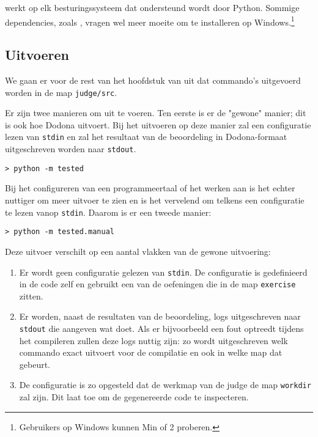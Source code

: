 \tested{} werkt op elk besturingssysteem dat ondersteund wordt door Python.
Sommige dependencies, zoals , vragen wel meer moeite om te installeren op Windows.\footnote{Gebruikers op Windows kunnen Min of 2 proberen.}

\subsection{Uitvoeren}\label{subsec:uitvoeren}

We gaan er voor de rest van het hoofdstuk van uit dat commando's uitgevoerd worden in de map \texttt{judge/src}.

Er zijn twee manieren om \tested{} uit te voeren.
Ten eerste is er de "gewone" manier;
dit is ook hoe Dodona \tested{} uitvoert.
Bij het uitvoeren op deze manier zal \tested{} een configuratie lezen van \texttt{stdin} en zal het resultaat van de beoordeling in Dodona-formaat uitgeschreven worden naar \texttt{stdout}.

\begin{verbatim}
> python -m tested
\end{verbatim}

Bij het configureren van een programmeertaal of het werken aan \tested{} is het echter nuttiger om meer uitvoer te zien en is het vervelend om telkens een configuratie te lezen vanop \texttt{stdin}.
Daarom is er een tweede manier:

\begin{verbatim}
> python -m tested.manual
\end{verbatim}

Deze uitvoer verschilt op een aantal vlakken van de gewone uitvoering:

\begin{enumerate}
    \item Er wordt geen configuratie gelezen van \texttt{stdin}.
    De configuratie is gedefinieerd in de code zelf en gebruikt een van de oefeningen die in de map \texttt{exercise} zitten.
    \item Er worden, naast de resultaten van de beoordeling, logs uitgeschreven naar \texttt{stdout} die aangeven wat \tested{} doet.
    Als er bijvoorbeeld een fout optreedt tijdens het compileren zullen deze logs nuttig zijn: zo wordt uitgeschreven welk commando \tested{} exact uitvoert voor de compilatie en ook in welke map dat gebeurt.
    \item De configuratie is zo opgesteld dat de werkmap van de judge de map \texttt{workdir} zal zijn.
    Dit laat toe om de gegenereerde code te inspecteren.
\end{enumerate}

